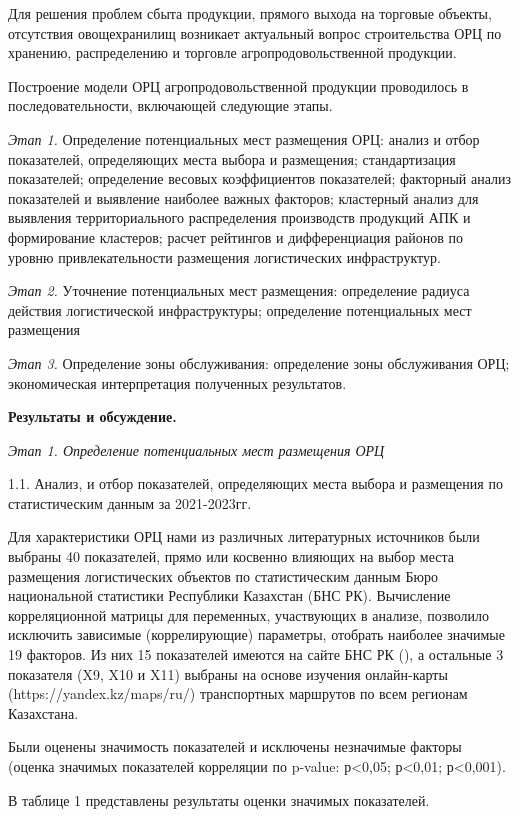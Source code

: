 \begin{multicols}{2}
Для решения проблем сбыта продукции, прямого выхода на торговые объекты,
отсутствия овощехранилищ возникает актуальный вопрос строительства ОРЦ
по хранению, распределению и торговле агропродовольственной продукции.~

Построение модели ОРЦ агропродовольственной продукции проводилось в
последовательности, включающей следующие этапы.

\emph{Этап 1.} Определение потенциальных мест размещения ОРЦ: анализ и
отбор показателей, определяющих места выбора и размещения;
стандартизация показателей; определение весовых коэффициентов
показателей; факторный анализ показателей и выявление наиболее важных
факторов; кластерный анализ для выявления территориального распределения
производств продукций АПК и формирование кластеров; расчет рейтингов и
дифференциация районов по уровню привлекательности размещения
логистических инфраструктур.

\emph{Этап 2.} Уточнение потенциальных мест размещения: определение
радиуса действия логистической инфраструктуры; определение потенциальных
мест размещения

\emph{Этап 3.} Определение зоны обслуживания: определение зоны
обслуживания ОРЦ; экономическая интерпретация полученных результатов.

{\bfseries Результаты и обсуждение.}

\emph{Этап 1. Определение потенциальных мест размещения ОРЦ}

1.1. Анализ, и отбор показателей, определяющих места выбора и размещения
по статистическим данным за 2021-2023гг.

Для характеристики ОРЦ нами из различных литературных источников были
выбраны 40 показателей, прямо или косвенно влияющих на выбор места
размещения логистических объектов по статистическим данным Бюро
национальной статистики Республики Казахстан (БНС РК). Вычисление
корреляционной матрицы для переменных, участвующих в анализе, позволило
исключить зависимые (коррелирующие) параметры, отобрать наиболее
значимые 19 факторов. Из них 15 показателей имеются на сайте БНС РК
(\href{https://stat.gov.kz/en/}{}), а
остальные 3 показателя (X9, X10 и X11) выбраны на основе изучения
онлайн-карты (https://yandex.kz/maps/ru/) транспортных маршрутов по всем
регионам Казахстана.

Были оценены значимость показателей и исключены незначимые факторы
(оценка значимых показателей корреляции по p-value: р\textless0,05;
р\textless0,01; р\textless0,001).

В таблице 1 представлены результаты оценки значимых показателей.
\end{multicols}

